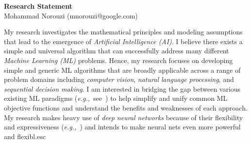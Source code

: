 \documentclass[a4paper, 10pt]{article}
\def\eg{{\em e.g.,}}
\begin{document}
\thispagestyle{fancy}
\lhead{}
\rhead{}
\renewcommand{\headrulewidth}{0pt} 
\renewcommand{\footrulewidth}{0pt} 
\fancyfoot[C]{\footnotesize \textcolor{gray}{https://norouzi.github.io/}} 


\pagestyle{fancy}
\lhead{\textcolor{gray}{\it Mohammad Norouzi}}
\rhead{\textcolor{gray}{\thepage/\totalpages{}}}


\begin{center}
{\LARGE \bf Research Statement}\\
\vspace*{0.1cm}
{\normalsize Mohammad Norouzi (mnorouzi@google.com)}
\vspace*{0.2cm}
\end{center}




My research investigates the mathematical principles and modeling
assumptions that lead to the emergence of {\em Artificial Intelligence
  (AI)}.  I believe there exists a simple and universal algorithm that
can successfully address many different {\em Machine Learning (ML)}
problems. Hence, my research focuses on developing simple and generic
ML algorithms that are broadly applicable across a range of problem
domains including {\em computer vision}, {\em natural language
  processing}, and {\em sequential decision making}. I am interested
in bridging the gap between various existing ML paradigms
(\eg~see~\cite{raml,pcl}) to help simplify and unify common ML
objective functions and understand the benefits and weaknesses of each
approach. My research makes heavy use of {\em deep neural networks}
because of their flexibility and expressiveness
(\eg~\cite{seq2seq,alphago}) and intends to make neural nets even more
powerful and flexibl.esc
\end{document}
